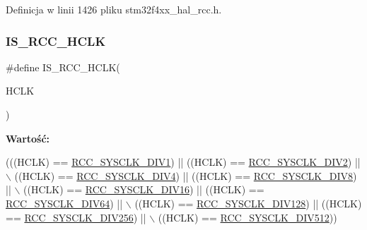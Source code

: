 Definicja w linii 1426 pliku stm32f4xx\+\_\+hal\+\_\+rcc.\+h.

\mbox{\label{group___r_c_c___i_s___r_c_c___definitions_ga6e9f1c193a2f41bcb3c2f7fa8459b5b3}} 
\subsubsection{\texorpdfstring{I\+S\+\_\+\+R\+C\+C\+\_\+\+H\+C\+LK}{IS\_RCC\_HCLK}}
{\footnotesize\ttfamily \#define I\+S\+\_\+\+R\+C\+C\+\_\+\+H\+C\+LK(\begin{DoxyParamCaption}\item[{}]{H\+C\+LK }\end{DoxyParamCaption})}

{\bfseries Wartość\+:}
\begin{DoxyCode}
(((HCLK) == \hyperlink{group___r_c_c___a_h_b___clock___source_ga226f5bf675015ea677868132b6b83494}{RCC\_SYSCLK\_DIV1})   || ((HCLK) == \hyperlink{group___r_c_c___a_h_b___clock___source_gac37c0610458a92e3cb32ec81014625c3}{RCC\_SYSCLK\_DIV2})   || \(\backslash\)
                           ((HCLK) == \hyperlink{group___r_c_c___a_h_b___clock___source_ga6fd3652d6853563cdf388a4386b9d22f}{RCC\_SYSCLK\_DIV4})   || ((HCLK) == 
      \hyperlink{group___r_c_c___a_h_b___clock___source_ga7def31373854ba9c72bb76b1d13e3aad}{RCC\_SYSCLK\_DIV8})   || \(\backslash\)
                           ((HCLK) == \hyperlink{group___r_c_c___a_h_b___clock___source_ga895462b261e03eade3d0139cc1327a51}{RCC\_SYSCLK\_DIV16})  || ((HCLK) == 
      \hyperlink{group___r_c_c___a_h_b___clock___source_ga73814b5a7ee000687ec8334637ca5b14}{RCC\_SYSCLK\_DIV64})  || \(\backslash\)
                           ((HCLK) == \hyperlink{group___r_c_c___a_h_b___clock___source_ga43eddf4d4160df30548a714dce102ad8}{RCC\_SYSCLK\_DIV128}) || ((HCLK) == 
      \hyperlink{group___r_c_c___a_h_b___clock___source_ga94956d6e9c3a78230bf660b838f987e2}{RCC\_SYSCLK\_DIV256}) || \(\backslash\)
                           ((HCLK) == \hyperlink{group___r_c_c___a_h_b___clock___source_gabe18a9d55c0858bbfe3db657fb64c76d}{RCC\_SYSCLK\_DIV512}))
\end{DoxyCode}


